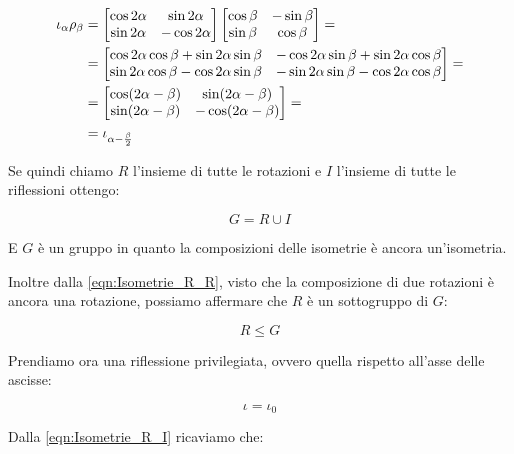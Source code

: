 \begin{align}
	\iota_\alpha \rho_\beta & = 
	\begin{bmatrix}
		\cos 2\alpha & \sin 2\alpha \\
		\sin 2\alpha & -\cos 2\alpha
	\end{bmatrix}
	\begin{bmatrix}
		\cos \beta & -\sin \beta \\
		\sin \beta & \cos \beta
	\end{bmatrix} 
	= \notag \\
	& = 
	\begin{bmatrix}
		\cos 2\alpha \cos \beta +\sin 2\alpha \sin \beta & - \cos 2\alpha \sin \beta + \sin 2\alpha \cos \beta \\
		\sin 2\alpha \cos \beta - \cos 2\alpha \sin \beta & - \sin 2\alpha \sin \beta - \cos 2\alpha \cos \beta
	\end{bmatrix} 
	= \notag \\
	& = 
	\begin{bmatrix}
		\cos (2\alpha - \beta) & \sin (2\alpha - \beta) \\
		\sin (2\alpha - \beta) & -\cos (2\alpha - \beta)
	\end{bmatrix} 
	= \notag \\
	\label{eqn:Isometrie_I_R}
	& = \iota_{\alpha-\frac{\beta}{2}}
\end{align}

Se quindi chiamo $R$ l'insieme di tutte le rotazioni e $I$ l'insieme di tutte le riflessioni ottengo:

\begin{equation}
	G = R \cup I
\end{equation}

E $G$ è un gruppo in quanto la composizioni delle isometrie è ancora un'isometria.

Inoltre dalla \eqref{eqn:Isometrie_R_R}, visto che la composizione di due rotazioni è ancora una rotazione, possiamo affermare che $R$ è un sottogruppo di $G$:

\begin{equation}
	R \le G
\end{equation}

Prendiamo ora una riflessione privilegiata, ovvero quella rispetto all'asse delle ascisse:

\begin{equation}
	\iota = \iota_0
\end{equation}

Dalla \eqref{eqn:Isometrie_R_I} ricaviamo che:

